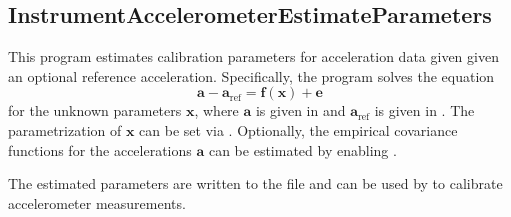 \subsection{InstrumentAccelerometerEstimateParameters}\label{InstrumentAccelerometerEstimateParameters}
This program estimates calibration parameters for acceleration data given given an optional reference acceleration.
Specifically, the program solves the equation
\begin{equation}
  \mathbf{a} - \mathbf{a}_\text{ref} = \mathbf{f}(\mathbf{x}) + \mathbf{e}
\end{equation}
for the unknown parameters $\mathbf{x}$, where $\mathbf{a}$ is given in  and
$\mathbf{a}_\text{ref}$ is given in  .
The parametrization of $\mathbf{x}$ can be set via .
Optionally, the empirical covariance functions for the accelerations $\mathbf{a}$ can be estimated by enabling .

The estimated parameters are written to the file  and can be used by
 to calibrate accelerometer measurements.


